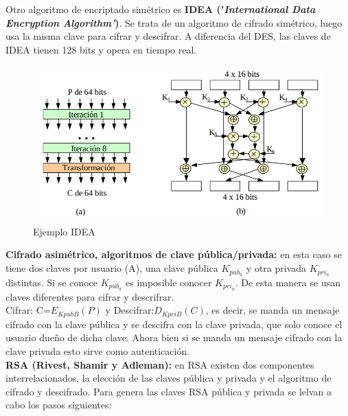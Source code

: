 \documentclass[a4paper,11pt]{article}
\begin{document}
Otro algoritmo de encriptado simétrico es \textbf{IDEA ('\textit{International Data Encryption Algorithm'})}. Se trata de un algoritmo de cifrado simétrico, luego usa la misma clave para cifrar y descifrar. A diferencia del DES, las claves de IDEA tienen 128 bits y opera en tiempo real. \\

\begin{figure}[h]
\centering
\caption{Ejemplo IDEA}
\includegraphics[scale=1,width=1\textwidth]{esquema_IDEA.png}
\end{figure}

\textbf{Cifrado asimétrico, algoritmos de clave pública/privada:} en esta caso se tiene dos claves por usuario (A), una clave pública $K_{pub_a}$ y otra privada $K_{pri_a}$ distintas. Si se conoce $K_{pub_a}$ es imposible conocer $K_{pri_a}$. De esta manera se usan claves diferentes para cifrar y descrifrar. \\

Cifrar: C=$E_{KpubB}(P)$ y Descifrar:$D_{KpriB}(C)$, es decir, se manda un mensaje cifrado con la clave pública y se descifra con la clave privada, que solo conoce el usuario dueño de dicha clave. Ahora bien si se manda un mensaje cifrado con la clave privada esto sirve como autenticación. \\

\textbf{RSA (Rivest, Shamir y Adleman):} en RSA existen dos componentes interrelacionados, la elección de las claves pública y privada y el algoritmo de cifrado y descifrado. Para genera las claves RSA pública y privada se lelvan a cabo los pasos siguientes:
\end{document}
